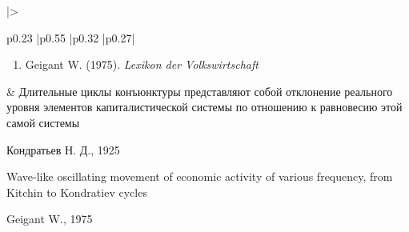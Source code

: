 \begin{longtable}{
    |>{\raggedright\arraybackslash}p{0.23\textwidth}
    |p{0.55\textwidth}
    |p{0.32\textwidth}
    |p{0.27\textwidth}|
    }
\begin{minipage}[t]{\linewidth}
\begin{enumerate}
        \item Geigant W. (1975). \textit{Lexikon der Volkswirtschaft}\cite{Geigant-1975}
    \end{enumerate}
\end{minipage}
&
\textquotedbl{}Длительные циклы конъюнктуры представляют собой отклонение реального уровня элементов капиталистической системы по отношению к равновесию этой самой системы\textquotedbl{}
\begin{flushright}
    Кондратьев Н. Д., 1925\cite{Кондратьев-1925}
\end{flushright}
\vspace{7pt}
\textquotedbl{}Wave-like oscillating movement of economic activity of various frequency, from Kitchin to Kondratiev cycles\textquotedbl{}
\begin{flushright}
    Geigant W., 1975\cite{Geigant-1975}
\end{flushright}
\\ \hline


\end{longtable}
